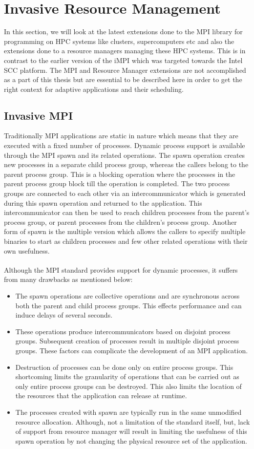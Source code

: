 \section{Invasive Resource Management}
In this section, we will look at the latest extensions done to the MPI library for programming on HPC systems like clusters, supercomputers etc and also the extensions done to a resource managers managing these HPC systems. This is in contrast to the earlier version of the iMPI which was targeted towards the Intel SCC platform. The MPI and Resource Manager extensions are not accomplished as a part of this thesis but are essential to be described here in order to get the right context for adaptive applications and their scheduling.
\subsection{Invasive MPI}
Traditionally MPI applications are static in nature which means that they are executed with a fixed number of processes. Dynamic process support is available through the MPI spawn and its related operations. The spawn operation creates new processes in a separate child process group, whereas the callers belong to the parent process group. This is a blocking operation where the processes in the parent process group block till the operation is completed. The two process groups are connected to each other via an intercommunicator which is generated during this spawn operation and returned to the application. This intercommunicator can then be used to reach children processes from the parent's process group, or parent processes from the children's process group. Another form of spawn is the multiple version which allows the callers to specify multiple binaries to start as children processes and few other related operations with their own usefulness.\\ \\
\noindent
Although the MPI standard provides support for dynamic processes, it suffers from many drawbacks as mentioned below:
\begin{itemize}
\item The spawn operations are collective operations and are synchronous across both the parent and child process groups. This effects performance and can induce delays of several seconds.
\item These operations produce intercommunicators based on disjoint process groups. Subsequent creation of processes result in multiple disjoint process groups. These factors can complicate the development of an MPI application.
\item Destruction of processes can be done only on entire process groups. This shortcoming limits the granularity of operations that can be carried out as only entire process groups can be destroyed. This also limits the location of the resources that the application can release at runtime.
\item The processes created with spawn are typically run in the same unmodified resource allocation. Although, not a limitation of the standard itself, but, lack of support from resource manager will result in limiting the usefulness of this spawn operation by not changing the physical resource set of the application.
\end{itemize}

